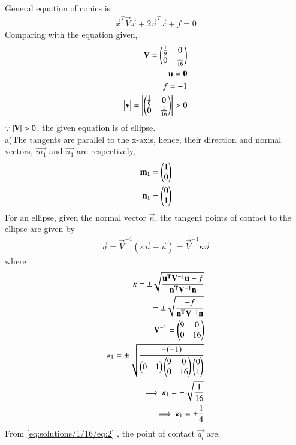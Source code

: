 
General equation of conics is 
\begin{align}
    \vec{x}^T\vec{V}\vec{x}+ 2\vec{u}^T\vec{x}+f = 0
    \label{eq:solutions/1/16/eq:1}
\end{align}
Comparing with the equation given,
\begin{align}
\mathbf{V}=\begin{pmatrix}\frac{1}{9} & 0 \\ 0 & \frac{1}{16}\end{pmatrix}\\
\mathbf{u}=\mathbf{0}\\
f=-1\\
\begin{vmatrix}\mathbf{v}\end{vmatrix}=\begin{vmatrix}\begin{pmatrix}\frac{1}{9} & 0 \\ 0 & \frac{1}{16}\end{pmatrix}\end{vmatrix}>0
\end{align}
$\because \left\vert\mathbf{V}\right\vert>0$, the given equation is of ellipse.\\
a)The tangents are parallel to the x-axis, hence, their direction and normal vectors, $\vec{m_1}$ and $\vec{n_1}$ are respectively,
\begin{align}
\mathbf{m_1}=\begin{pmatrix}1\\0\end{pmatrix}\\
\mathbf{n_1}=\begin{pmatrix}0\\1\end{pmatrix}
\end{align}
For an ellipse, given the normal vector $\vec{n}$, the tangent points of contact to the ellipse are given by
\begin{align}
    \vec{q}=\vec{V}^{-1}(\kappa \vec{n}-\vec{u})
    \label{eq:solutions/1/16/eq:2}
    =\vec{V}^{-1}\kappa \vec{n}
\end{align}
where
\begin{align}
    \kappa=\pm \sqrt{\frac{\mathbf{u^T}\mathbf{V}^{-1}\mathbf{u}-f}{\mathbf{n^T}\mathbf{V}^{-1}\mathbf{n}}}
    \label{eq:solutions/1/16/eq:2.0.9}\\
   =\pm \sqrt{\frac{-f}{\mathbf{n^T}\mathbf{V}^{-1}\mathbf{n}}}\\
    \mathbf{V}^{-1}=\begin{pmatrix}9 & 0 \\ 0 & 16\end{pmatrix}\\
    \kappa_1=\pm \sqrt{\frac{-(-1)}{\begin{pmatrix}0 & 1\end{pmatrix}\begin{pmatrix}9 & 0 \\ 0 & 16\end{pmatrix} \begin{pmatrix}0\\1\end{pmatrix}}}\\
 \implies \kappa_1=\pm \sqrt{\frac{1}{16}}\\
    \implies \kappa_1=\pm \frac{1}{4}      
\end{align}
From \eqref{eq:solutions/1/16/eq:2} , the point of contact $\vec{q_i}$ are,

